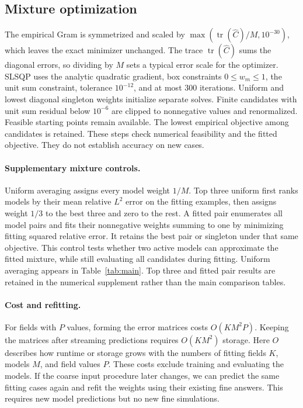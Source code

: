 \subsection{Mixture optimization}
\label{app:numerics}
The empirical Gram is symmetrized and scaled by
$\max(\operatorname{tr}(\widehat C)/M,10^{-30})$, which leaves the exact minimizer unchanged.
The trace $\operatorname{tr}(\widehat C)$ sums the diagonal errors, so dividing by
$M$ sets a typical error scale for the optimizer.
SLSQP uses the analytic quadratic gradient, box constraints $0\leq w_m\leq1$, the unit sum
constraint, tolerance $10^{-12}$, and at most 300 iterations. Uniform and lowest diagonal
singleton weights initialize separate solves. Finite candidates with unit sum residual below
$10^{-6}$ are clipped to nonnegative values and renormalized. Feasible starting points remain
available. The lowest empirical objective among candidates is retained. These steps check numerical feasibility and the fitted objective.
They do not establish accuracy on new cases.

\paragraph{Supplementary mixture controls.}
Uniform averaging assigns every model weight $1/M$. Top three uniform first
ranks models by their mean relative $L^2$ error on the fitting examples, then assigns
weight $1/3$ to the best three and zero to the rest. A fitted pair enumerates
all model pairs and fits their nonnegative weights summing to one by minimizing
fitting squared relative error. It retains the best pair or singleton under
that same objective. This control tests whether two active models can approximate
the fitted mixture, while still evaluating all candidates during fitting.
Uniform averaging appears in Table~\ref{tab:main}. Top three and fitted pair
results are retained in the numerical supplement rather than the main
comparison tables.

\paragraph{Cost and refitting.}
For fields with $P$ values, forming the error matrices costs $O(KM^2P)$.
Keeping the matrices after streaming predictions requires $O(KM^2)$ storage.
Here $O$ describes how runtime or storage grows with the numbers of fitting
fields $K$, models $M$, and field values $P$.
These costs exclude training and evaluating the models.
If the coarse input procedure later changes, we can predict the same fitting
cases again and refit the weights using their existing fine answers.
This requires new model predictions but no new fine simulations.

